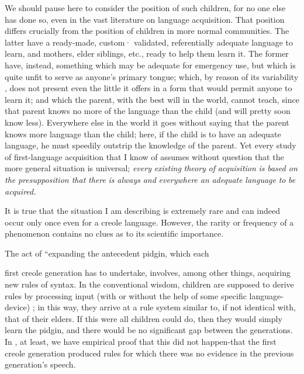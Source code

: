 We should pause here to consider the position of such children, for no one else has done so, even in the vast literature on language acquisition. That position differs crucially from the position of children in more normal communities. The latter have a ready-made, custom· validated, referentially adequate language to learn, and mothers, elder siblings, etc., ready to help them learn it. The former have, instead, something which may be adequate for emergency use, but which is quite unfit to serve as anyone's primary tongue; which, by reason of its variability , does not present even the little it offers in a form that would permit anyone to learn it; and which the parent, with the best will in the world, cannot teach, since that parent knows no more of the language than the child (and will pretty soon know less). Every\-where else in the world it goes without saying that the parent knows more language than the child; here, if the child is to have an adequate language, he must speedily outstrip the knowledge of the parent. Yet every study of first-language acquisition that I know of assumes without question that the more general situation is universal; \textit{every} \textit{existing} \textit{theory} \textit{of} \textit{acquisition }\textit{is} \textit{based on} \textit{the} \textit{presupposition that} \textit{there} \textit{is} \textit{always} \textit{and} \textit{everywhere} \textit{an} \textit{adequate} \textit{language} \textit{to} \textit{be acquired.}


It is true that the situation I am describing is extremely rare and can indeed occur only once even for a creole language. However, the rarity or frequency of a phenomenon contains no clues as to its scientific importance.

The act of ``expanding the antecedent pidgin, which each

first creole generation has to undertake, involves, among other things, acquiring new rules of syntax. In the conventional wisdom, children are supposed to derive rules by processing input (with or without the help of some specific language- device) ; in this way, they arrive at a rule system similar to, if not identical with, that of their elders. If this were all children could do, then they would simply learn the pidgin, and there would be no significant gap between the generations. In , at least, we have empirical proof that this did not happen-that the first creole generation produced rules for which there was no evidence in the previous generation's speech.

